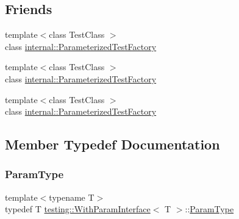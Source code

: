 \subsection*{Friends}
\begin{DoxyCompactItemize}
\item 
{\footnotesize template$<$class Test\+Class $>$ }\\class \mbox{\hyperlink{classtesting_1_1_with_param_interface_a7543eb7df89f00fff517dba24bc11dd5}{internal\+::\+Parameterized\+Test\+Factory}}
\item 
{\footnotesize template$<$class Test\+Class $>$ }\\class \mbox{\hyperlink{classtesting_1_1_with_param_interface_aaf83241c19b26c1e534944b6e03c0f90}{internal\+::\+Parameterized\+Test\+Factory}}
\item 
{\footnotesize template$<$class Test\+Class $>$ }\\class \mbox{\hyperlink{classtesting_1_1_with_param_interface_aaf83241c19b26c1e534944b6e03c0f90}{internal\+::\+Parameterized\+Test\+Factory}}
\end{DoxyCompactItemize}


\subsection{Member Typedef Documentation}
\mbox{\label{classtesting_1_1_with_param_interface_a343febaaebf1f025bda484f841d4fec1}} 
\subsubsection{\texorpdfstring{ParamType}{ParamType}\hspace{0.1cm}{\footnotesize\ttfamily [1/3]}}
{\footnotesize\ttfamily template$<$typename T$>$ \\
typedef T \mbox{\hyperlink{classtesting_1_1_with_param_interface}{testing\+::\+With\+Param\+Interface}}$<$ T $>$\+::\mbox{\hyperlink{classtesting_1_1_with_param_interface_a343febaaebf1f025bda484f841d4fec1}{Param\+Type}}}

\mbox{\label{classtesting_1_1_with_param_interface_a343febaaebf1f025bda484f841d4fec1}} 
